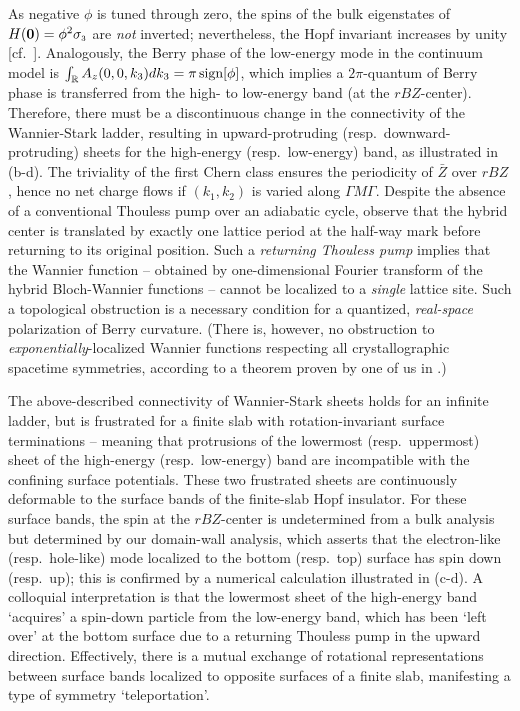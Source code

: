 \documentclass[aps,prl,showpacs,twocolumn,superscriptaddress]{revtex4-1}
\begin{document}
As negative $\phi$ is tuned through zero, the spins of the bulk eigenstates of $H(\boldsymbol{0})=\phi^2\sigma_{\scriptscriptstyle{3}}$ are  \textit{not} inverted; nevertheless, the Hopf invariant increases by unity [cf.\ ]. Analogously, the Berry phase of the low-energy mode in the continuum model is $\int_{\mathbb{R}} A_z(0,0,k_3) dk_3=\pi \,\text{sign}[\phi]$, which implies a $2\pi$-quantum of Berry phase is transferred from the high- to low-energy band (at the $rBZ$-center). Therefore, there must  be a discontinuous change in the connectivity of the Wannier-Stark ladder, resulting in upward-protruding (resp.\ downward-protruding) sheets for the high-energy (resp.\ low-energy) band, as illustrated in (b-d).  The triviality of the first Chern class ensures the periodicity of $\bar{Z}$ over $rBZ$, hence no net charge flows if $(k_1,k_2)$ is varied along ${\Gamma}M{\Gamma}$. Despite the absence of a conventional Thouless pump over an adiabatic cycle,\cite{thouless_pump} observe that the hybrid center  is translated by exactly one lattice period at the half-way mark before returning to its original position. Such a \textit{returning Thouless pump} implies that the Wannier function -- obtained by one-dimensional Fourier transform of the hybrid Bloch-Wannier functions -- cannot be localized to a \textit{single} lattice site. Such a topological obstruction is a necessary condition for a quantized, \textit{real-space} polarization of Berry curvature. (There is, however, no obstruction to \textit{exponentially}-localized Wannier functions respecting all crystallographic spacetime symmetries, according to a theorem proven by one of us in .)




The above-described connectivity of Wannier-Stark sheets holds for an infinite ladder, but is frustrated for a finite slab with  rotation-invariant surface terminations -- meaning that protrusions of the lowermost (resp.\ uppermost) sheet of the high-energy (resp.\ low-energy) band are incompatible with the confining surface potentials. These two frustrated sheets are continuously deformable to the surface bands of the finite-slab Hopf insulator.\cite{fidkowski_bulkboundary,Cohomological} For these surface bands, the spin at the $rBZ$-center is undetermined from a bulk analysis but determined by our domain-wall analysis, which asserts that the electron-like (resp.\ hole-like) mode localized to the bottom (resp.\ top) surface has spin down (resp.\ up); this is confirmed by a numerical calculation illustrated in (c-d). A colloquial interpretation is that the lowermost sheet of the high-energy band `acquires' a spin-down particle from the low-energy band, which has been `left over' at the bottom surface due to a returning Thouless pump in the upward direction. Effectively, there is a mutual exchange of rotational representations between surface bands localized to opposite surfaces of a finite slab, manifesting a type of symmetry `teleportation'. 
\end{document}
